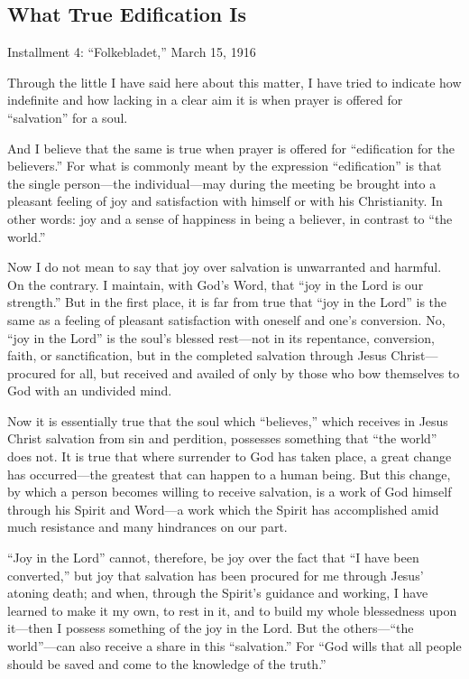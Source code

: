 
\subsection{What True Edification Is}

Installment 4: “Folkebladet,” March 15, 1916

Through the little I have said here about this matter, I have tried to indicate how indefinite and how lacking in a clear aim it is when prayer is offered for “salvation” for a soul.

And I believe that the same is true when prayer is offered for “edification for the believers.” For what is commonly meant by the expression “edification” is that the single person—the individual—may during the meeting be brought into a pleasant feeling of joy and satisfaction with himself or with his Christianity. In other words: joy and a sense of happiness in being a believer, in contrast to “the world.”

Now I do not mean to say that joy over salvation is unwarranted and harmful. On the contrary. I maintain, with God’s Word, that “joy in the Lord is our strength.” But in the first place, it is far from true that “joy in the Lord” is the same as a feeling of pleasant satisfaction with oneself and one’s conversion. No, “joy in the Lord” is the soul’s blessed rest—not in its repentance, conversion, faith, or sanctification, but in the completed salvation through Jesus Christ—procured for all, but received and availed of only by those who bow themselves to God with an undivided mind.

Now it is essentially true that the soul which “believes,” which receives in Jesus Christ salvation from sin and perdition, possesses something that “the world” does not. It is true that where surrender to God has taken place, a great change has occurred—the greatest that can happen to a human being. But this change, by which a person becomes willing to receive salvation, is a work of God himself through his Spirit and Word—a work which the Spirit has accomplished amid much resistance and many hindrances on our part.

“Joy in the Lord” cannot, therefore, be joy over the fact that “I have been converted,” but joy that salvation has been procured for me through Jesus’ atoning death; and when, through the Spirit’s guidance and working, I have learned to make it my own, to rest in it, and to build my whole blessedness upon it—then I possess something of the joy in the Lord. But the others—“the world”—can also receive a share in this “salvation.” For “God wills that all people should be saved and come to the knowledge of the truth.”

